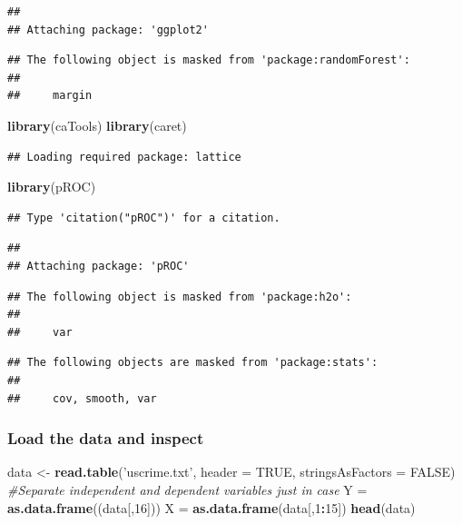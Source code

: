 \documentclass[]{article}
\newenvironment{Shaded}{\begin{snugshade}}{\end{snugshade}}
\newcommand{\KeywordTok}[1]{\textcolor[rgb]{0.13,0.29,0.53}{\textbf{#1}}}
\newcommand{\DataTypeTok}[1]{\textcolor[rgb]{0.13,0.29,0.53}{#1}}
\newcommand{\DecValTok}[1]{\textcolor[rgb]{0.00,0.00,0.81}{#1}}
\newcommand{\StringTok}[1]{\textcolor[rgb]{0.31,0.60,0.02}{#1}}
\newcommand{\CommentTok}[1]{\textcolor[rgb]{0.56,0.35,0.01}{\textit{#1}}}
\newcommand{\OtherTok}[1]{\textcolor[rgb]{0.56,0.35,0.01}{#1}}
\newcommand{\OperatorTok}[1]{\textcolor[rgb]{0.81,0.36,0.00}{\textbf{#1}}}
\newcommand{\NormalTok}[1]{#1}
\begin{document}
\begin{verbatim}
## 
## Attaching package: 'ggplot2'
\end{verbatim}

\begin{verbatim}
## The following object is masked from 'package:randomForest':
## 
##     margin
\end{verbatim}

\begin{Shaded}
\begin{Highlighting}[]
\KeywordTok{library}\NormalTok{(caTools)}
\KeywordTok{library}\NormalTok{(caret)}
\end{Highlighting}
\end{Shaded}

\begin{verbatim}
## Loading required package: lattice
\end{verbatim}

\begin{Shaded}
\begin{Highlighting}[]
\KeywordTok{library}\NormalTok{(pROC)}
\end{Highlighting}
\end{Shaded}

\begin{verbatim}
## Type 'citation("pROC")' for a citation.
\end{verbatim}

\begin{verbatim}
## 
## Attaching package: 'pROC'
\end{verbatim}

\begin{verbatim}
## The following object is masked from 'package:h2o':
## 
##     var
\end{verbatim}

\begin{verbatim}
## The following objects are masked from 'package:stats':
## 
##     cov, smooth, var
\end{verbatim}

\subsubsection{Load the data and
inspect}\label{load-the-data-and-inspect}

\begin{Shaded}
\begin{Highlighting}[]
\NormalTok{data <-}\StringTok{ }\KeywordTok{read.table}\NormalTok{(}\StringTok{'uscrime.txt'}\NormalTok{, }\DataTypeTok{header =} \OtherTok{TRUE}\NormalTok{, }\DataTypeTok{stringsAsFactors =} \OtherTok{FALSE}\NormalTok{)}
\CommentTok{#Separate independent and dependent variables just in case}
\NormalTok{Y =}\StringTok{ }\KeywordTok{as.data.frame}\NormalTok{((data[,}\DecValTok{16}\NormalTok{]))}
\NormalTok{X =}\StringTok{ }\KeywordTok{as.data.frame}\NormalTok{(data[,}\DecValTok{1}\OperatorTok{:}\DecValTok{15}\NormalTok{])}
\KeywordTok{head}\NormalTok{(data)}
\end{Highlighting}
\end{Shaded}
\end{document}
